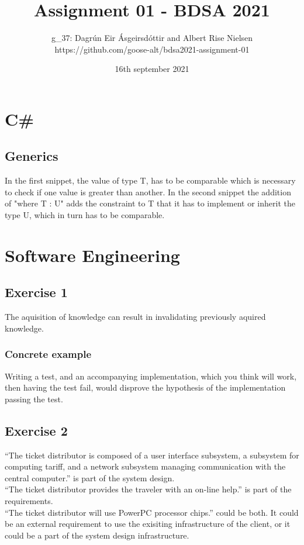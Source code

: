 \documentclass[11pt,oneside]{book}
\title{Assignment 01 - BDSA 2021}
\author{g\_37: Dagrún Eir Ásgeirsdóttir and Albert Rise Nielsen\\[1em] https://github.com/goose-alt/bdsa2021-assignment-01}
\date{16th september 2021}
\begin{document}
   \maketitle
   \frontmatter
   \tableofcontents

   \mainmatter
   \chapter{C\#}
   \section{Generics}
   In the first snippet, the value of type T, has to be comparable which is necessary to check if one value is greater than another.
   In the second snippet the addition of "where T : U" adds the constraint to T that it has to implement or inherit the type U, which in turn has to be comparable.

   \chapter{Software Engineering}
   \section{Exercise 1}
   The aquisition of knowledge can result in invalidating previously aquired knowledge.\\
   \subsection{Concrete example}
   Writing a test, and an accompanying implementation, which you think will work, then having the test fail, would disprove the hypothesis of the implementation passing the test.   

   \section{Exercise 2}
   “The ticket distributor is composed of a user interface subsystem, a subsystem for computing tariff, and a network subsystem managing communication with the central computer.” is part of the system design.\\
   “The ticket distributor provides the traveler with an on-line help.” is part of the requirements.\\

   “The ticket distributor will use PowerPC processor chips.” could be both. It could be an external requirement to use the exisiting infrastructure of the client, or it could be a part of the system design infrastructure.
\end{document}
